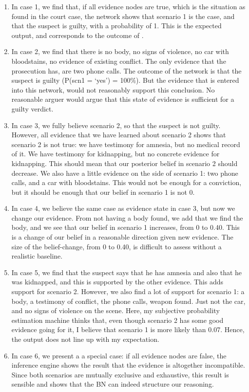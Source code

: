 \documentclass[12pt]{article}
\begin{document}
\begin{enumerate}
\item In case 1, we find that, if all evidence nodes are true, which is the situation as found in the court case, the network shows that scenario 1 is the case, and that the suspect is guilty, with a probability of 1. This is the expected output, and corresponds to the outcome of \citet{vanLeeuwen2019}.
\item In case 2, we find that there is no body, no signs of violence, no car with bloodstains, no evidence of existing conflict. The only evidence that the prosecution has, are two phone calls. The outcome of the network is that the suspect is guilty (P(scn1 = `yes') = 100\%). But the evidence that is entered into this network, would not reasonably support this conclusion. No reasonable arguer would argue that this state of evidence is sufficient for a guilty verdict.
\item In case 3, we fully believe scenario 2, so that the suspect is not guilty. However, all evidence that we have learned about scenario 2 shows that scenario 2 is not true: we have testimony for amnesia, but no medical record of it. We have testimony for kidnapping, but no concrete evidence for kidnapping. This should mean that our posterior belief in scenario 2 should decrease. We also have a little evidence on the side of scenario 1: two phone calls, and a car with bloodstains. This would not be enough for a conviction, but it should be enough that our belief in scenario 1 is not 0.
\item In case 4, we believe the same case as evidence state in case 3, but now we change our evidence. From not having a body found, we add that we find the body, and we see that our belief in scenario 1 increases, from 0 to 0.40. This is a change of our belief in a reasonable direction given new evidence. The size of the belief-change, from 0 to 0.40, is difficult to assess without a realistic baseline.
\item In case 5, we find that the suspect says that he has amnesia and also that he was kidnapped, and this is supported by the other evidence. This adds support for scenario 2. However, we also find a lot of support for scenario 1: a body, a testimony of conflict, the phone calls, weapon found. Just not the car, and no signs of violence on the scene. Here, my subjective probability estimation machine thinks that, even though scenario 2 has some good evidence going for it, I believe that scenario 1 is more likely than 0.07. Hence, the output does not line up with my expectation.
\item In case 6, we present a a special case: if all evidence nodes are false, the inference engine shows the result that the evidence is altogether incompatible. Since both scenarios are mutually exclusive and exhaustive, this result is sensible and shows that the BN can indeed structure our reasoning.
\end{enumerate}
\end{document}
